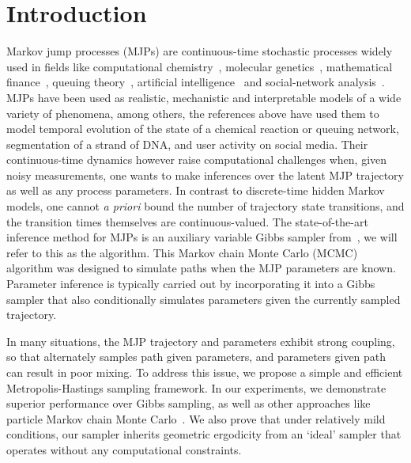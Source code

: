 
\section{Introduction}
\label{sec:intro}
Markov jump processes (MJPs) are continuous-time stochastic processes widely used in fields like computational chemistry~\citep{gillespie97}, molecular genetics~\citep{FearnSher2006}, mathematical finance~\citep{Elliott06}, queuing theory~\citep{Breuer2003}, artificial intelligence~\citep{XuShe10} and social-network analysis~\citep{pan2016markov}. 
MJPs have been used as realistic, mechanistic and interpretable models of a wide variety of phenomena, among others, the references above have used them to model temporal evolution of the state of a chemical reaction or queuing network, segmentation of a strand of DNA, and user activity on social media.
Their continuous-time dynamics however raise computational challenges when, given noisy measurements, one wants to make inferences 
over the latent MJP trajectory as well as any process parameters. 
In contrast to {discrete-time} hidden Markov models, one cannot 
{\em a priori} bound the number of trajectory state transitions, and the transition times themselves are continuous-valued. 
The state-of-the-art inference method for MJPs is an auxiliary variable Gibbs sampler from~\cite{RaoTeh13}, we will refer to this as the {\algname} algorithm. 
This Markov chain Monte Carlo (MCMC) algorithm was designed to simulate paths when the MJP parameters are known. 
Parameter inference is typically carried out by incorporating it into a Gibbs sampler that also conditionally simulates parameters given the currently sampled trajectory. 

In many situations, the MJP trajectory and parameters exhibit strong coupling, so that alternately samples path given parameters, and parameters given path can result in poor mixing.  
To address this issue, we propose a simple and efficient Metropolis-Hastings sampling framework. 
In our experiments, we demonstrate superior performance over Gibbs sampling, as well as other approaches like particle Markov chain Monte Carlo~\citep{Andrieu10}. 
We also prove that under relatively mild conditions, our sampler inherits geometric ergodicity from an `ideal' sampler that operates without any computational constraints.

